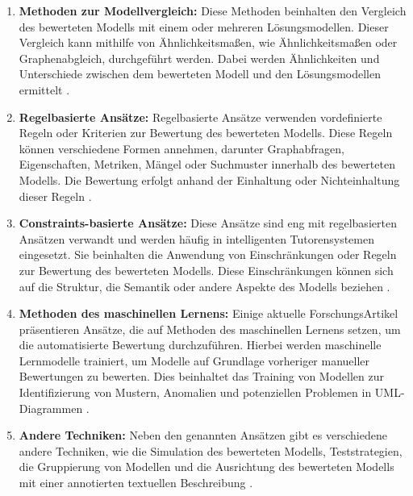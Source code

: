 \begin{enumerate}
    \item \textbf{Methoden zur Modellvergleich:}  Diese Methoden beinhalten den Vergleich des bewerteten Modells mit einem oder mehreren Lösungsmodellen. Dieser Vergleich kann mithilfe von Ähnlichkeitsmaßen, wie Ähnlichkeitsmaßen oder Graphenabgleich, durchgeführt werden. Dabei werden Ähnlichkeiten und Unterschiede zwischen dem bewerteten Modell und den Lösungsmodellen ermittelt \cite{ullrich2021automated} \cite{fauzan2021different}.

    \item \textbf{Regelbasierte Ansätze:} Regelbasierte Ansätze verwenden vordefinierte Regeln oder Kriterien zur Bewertung des bewerteten Modells. Diese Regeln können verschiedene Formen annehmen, darunter Graphabfragen, Eigenschaften, Metriken, Mängel oder Suchmuster innerhalb des bewerteten Modells. Die Bewertung erfolgt anhand der Einhaltung oder Nichteinhaltung dieser Regeln \cite{ullrich2021automated} \cite{striewe2011automated}.

    \item \textbf{Constraints-basierte Ansätze:} Diese Ansätze sind eng mit regelbasierten Ansätzen verwandt und werden häufig in intelligenten Tutorensystemen eingesetzt. Sie beinhalten die Anwendung von Einschränkungen oder Regeln zur Bewertung des bewerteten Modells. Diese Einschränkungen können sich auf die Struktur, die Semantik oder andere Aspekte des Modells beziehen \cite{ullrich2021automated} \cite{holland2011effects}.

    \item \textbf{Methoden des maschinellen Lernens:}  Einige aktuelle ForschungsArtikel präsentieren Ansätze, die auf Methoden des maschinellen Lernens setzen, um die automatisierte Bewertung durchzuführen. Hierbei werden maschinelle Lernmodelle trainiert, um Modelle auf Grundlage vorheriger manueller Bewertungen zu bewerten. Dies beinhaltet das Training von Modellen zur Identifizierung von Mustern, Anomalien und potenziellen Problemen in UML-Diagrammen \cite{ullrich2021automated} \cite{boubekeur2020automatic} \cite{ml}.

    \item \textbf{Andere Techniken:}  Neben den genannten Ansätzen gibt es verschiedene andere Techniken, wie die Simulation des bewerteten Modells, Teststrategien, die Gruppierung von Modellen und die Ausrichtung des bewerteten Modells mit einer annotierten textuellen Beschreibung \cite{ullrich2021automated} .


\end{enumerate}
